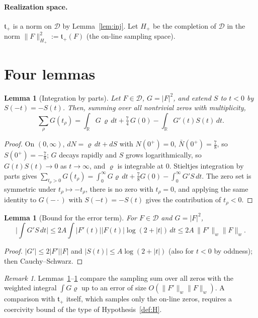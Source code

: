 \documentclass[11pt]{amsart}
\newtheorem{lemma}[theorem]{Lemma}
\theoremstyle{definition}
\theoremstyle{remark}
\newtheorem{remark}[theorem]{Remark}
\newcommand{\tplus}{\mathfrak t_+}
\newcommand{\Hplus}{H_+}
\newcommand{\Norm}[1]{\lVert #1 \rVert}
\begin{document}
\paragraph{Realization space.} $\tplus$ is a norm on $\mathcal D$ by
Lemma~\ref{lem:inj}. Let $\Hplus$ be the completion of $\mathcal D$ in the norm
$\Norm{F}_{\Hplus}^{2}:=\tplus(F)$ (the on-line sampling space).

\section{Four lemmas}\label{sec:lemmas}

\begin{lemma}[Integration by parts]\label{lem:A}
Let $F\in\mathcal D$, $G=|F|^{2}$, and extend $S$ to $t<0$ by $S(-t)=-S(t)$. Then,
summing over all nontrivial zeros with multiplicity,
\[
\sum_{\rho}G(t_\rho)=\int_{\mathbb R}G\,\varrho\,dt+\tfrac74\,G(0)-\int_{\mathbb R}G'(t)S(t)\,dt .
\]
\end{lemma}
\begin{proof}
On $(0,\infty)$, $dN=\varrho\,dt+dS$ with $N(0^{+})=0$, $\bar N(0^{+})=\tfrac78$, so
$S(0^{+})=-\tfrac78$; $G$ decays rapidly and $S$ grows logarithmically, so
$G(t)S(t)\to0$ as $t\to\infty$, and $\varrho$ is integrable at $0$. Stieltjes integration by
parts gives
$\sum_{t_\rho>0}G(t_\rho)=\int_0^\infty G\varrho\,dt+\tfrac78G(0)-\int_0^\infty G'S\,dt$.
The zero set is symmetric under $t_\rho\mapsto-t_\rho$, there is no zero with $t_\rho=0$,
and applying the same identity to $G(-\cdot)$ with $S(-t)=-S(t)$ gives the contribution of
$t_\rho<0$.
\end{proof}

\begin{lemma}[Bound for the error term]\label{lem:B}
For $F\in\mathcal D$ and $G=|F|^{2}$,
\[
\Big|\int G'S\,dt\Big|\le 2A\int|F'(t)||F(t)|\log(2+|t|)\,dt\le 2A\,\Norm{F'}_w\Norm{F}_w .
\]
\end{lemma}
\begin{proof}
$|G'|\le2|F'||F|$ and $|S(t)|\le A\log(2+|t|)$ (also for $t<0$ by oddness); then
Cauchy--Schwarz.
\end{proof}

\begin{remark}\label{rem:Onoto}
Lemmas~\ref{lem:A}--\ref{lem:B} compare the sampling sum over all zeros with the weighted
integral $\int G\varrho$ up to an error of size $O(\Norm{F'}_w\Norm{F}_w)$. A comparison
with $\tplus$ itself, which samples only the on-line zeros, requires a coercivity bound of
the type of Hypothesis~\ref{def:H}.
\end{remark}
\end{document}
